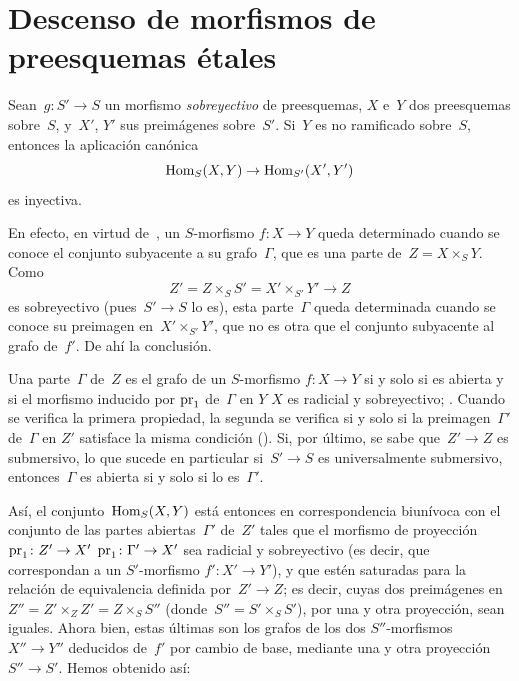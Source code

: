 \section{Descenso de morfismos de preesquemas étales}
\label{IX.3}

\begin{proposition}
\label{IX.3.1}
Sean~$g\colon S'\to S$ un morfismo \emph{sobreyectivo} de preesquemas,
$X$ e~$Y$ dos preesquemas sobre~$S$, y~$X'$, $Y'$ sus preimágenes
sobre~$S'$. Si~$Y$ es no ramificado sobre~$S$, entonces la aplicación
canónica
$$
\operatorname{Hom}_S(X,Y) \to \operatorname{Hom}_{S'}(X',Y')
$$
es inyectiva.
\end{proposition}

En efecto, en virtud de~, un $S$-morfismo
$f\colon X\to Y$ queda determinado cuando se conoce el conjunto subyacente
a su grafo~$\Gamma$, que es una parte de~$Z=X\times_SY$. Como
$$
Z'=Z\times_SS'=X'\times_{S'}Y' \to Z
$$
es sobreyectivo (pues~$S'\to S$ lo es), esta parte~$\Gamma$ queda
determinada cuando se conoce su preimagen en~$X'\times_{S'}Y'$, que no es
otra que el conjunto subyacente al grafo de~$f'$. De ahí la conclusión.

Una parte~$\Gamma$ de~$Z$ es el grafo de un $S$-morfismo
$f\colon X\to Y$ si y solo si es abierta y si el morfismo inducido por
$\mathrm{pr}_1$ de~$\Gamma$ en
{$Y$}
{$X$}
es radicial
y sobreyectivo; \cf {}. Cuando se verifica la primera propiedad,
la segunda se verifica si y solo si la preimagen~$\Gamma'$ de~$\Gamma$ en
$Z'$ satisface la misma condición (). Si, por último, se sabe
que~$Z'\to Z$ es submersivo, lo que sucede en particular si~$S'\to S$ es
universalmente submersivo, entonces~$\Gamma$ es abierta si y solo si lo
es~$\Gamma'$.

Así, el conjunto~$\operatorname{Hom}_S(X,Y)$ está entonces en correspondencia biunívoca
con el conjunto de las partes abiertas~$\Gamma'$ de~$Z'$ tales que el
morfismo de proyección
{$\mathrm{pr}_1\colon Z'\to X'$}
{$\mathrm{pr}_1\colon \Gamma'\to X'$}
sea radicial y sobreyectivo (es decir, que correspondan a un $S'$-morfismo
$f'\colon X'\to Y'$), y que estén saturadas para la relación de
equivalencia definida por~$Z'\to Z$; es decir, cuyas dos preimágenes en
$Z''=Z'\times_Z Z'=Z\times_S S''$ (donde~$S''=S'\times_S S'$), por una y
otra proyección, sean iguales. Ahora bien, estas últimas son los grafos de
los dos $S''$-morfismos~$X''\to Y''$ deducidos de~$f'$ por cambio de base,
mediante una y otra proyección~$S''\to S'$. Hemos obtenido así:

